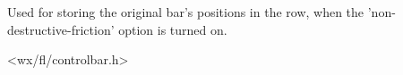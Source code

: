 %
%


\section{}\label{cbbarshapedata}


Used for storing the original bar's positions in the row, when the 'non-destructive-friction'
option is turned on.




<wx/fl/controlbar.h>


